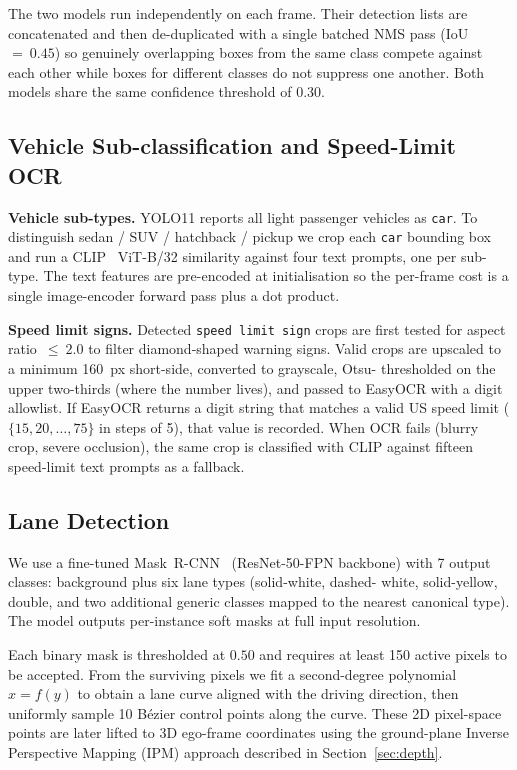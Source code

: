 \documentclass[conference]{IEEEtran}
\begin{document}
The two models run independently on each frame.  Their detection lists are
concatenated and then de-duplicated with a single batched NMS pass
(IoU~$=~0.45$) so genuinely overlapping boxes from the same class compete
against each other while boxes for different classes do not suppress one
another.  Both models share the same confidence threshold of $0.30$.

\subsection{Vehicle Sub-classification and Speed-Limit OCR}

\textbf{Vehicle sub-types.}
YOLO11 reports all light passenger vehicles as \texttt{car}.  To distinguish
sedan / SUV / hatchback / pickup we crop each \texttt{car} bounding box and
run a CLIP~\cite{radford2021clip} ViT-B/32 similarity against four text
prompts, one per sub-type.  The text features are pre-encoded at
initialisation so the per-frame cost is a single image-encoder forward pass
plus a dot product.

\textbf{Speed limit signs.}
Detected \texttt{speed limit sign} crops are first tested for aspect
ratio~$\le~2.0$ to filter diamond-shaped warning signs.  Valid crops are
upscaled to a minimum 160~px short-side, converted to grayscale, Otsu-
thresholded on the upper two-thirds (where the number lives), and passed
to EasyOCR with a digit allowlist.  If EasyOCR returns a digit string that
matches a valid US speed limit ($\{15, 20, \ldots, 75\}$ in steps of 5),
that value is recorded.  When OCR fails (blurry crop, severe occlusion), the
same crop is classified with CLIP against fifteen speed-limit text prompts as
a fallback.

\subsection{Lane Detection}

We use a fine-tuned Mask~R-CNN~\cite{he2017maskrcnn} (ResNet-50-FPN backbone)
with 7 output classes: background plus six lane types (solid-white, dashed-
white, solid-yellow, double, and two additional generic classes mapped to the
nearest canonical type).  The model outputs per-instance soft masks at full
input resolution.

Each binary mask is thresholded at $0.50$ and requires at least 150 active
pixels to be accepted.  From the surviving pixels we fit a second-degree
polynomial $x = f(y)$ to obtain a lane curve aligned with the driving
direction, then uniformly sample 10 B\'ezier control points along the curve.
These 2D pixel-space points are later lifted to 3D ego-frame coordinates
using the ground-plane Inverse Perspective Mapping (IPM) approach described
in Section~\ref{sec:depth}.
\end{document}
